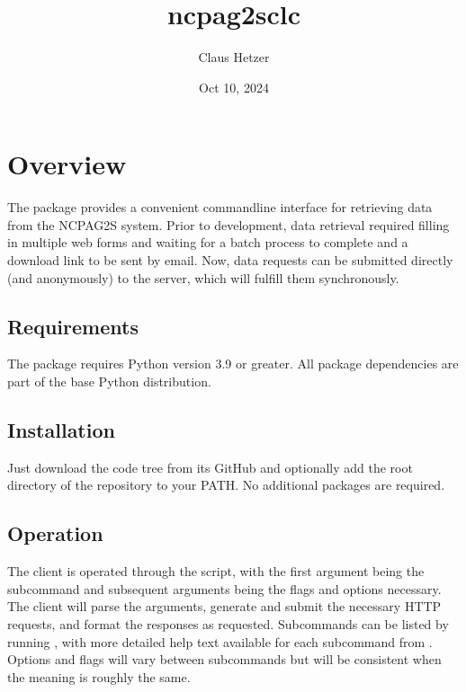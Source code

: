 \documentclass[letterpaper,10pt,english]{sphinxmanual}
\title{ncpag2s\sphinxhyphen{}clc}
\date{Oct 10, 2024}
\author{Claus Hetzer}
\begin{document}
\pagestyle{empty}
\sphinxmaketitle
\pagestyle{plain}
\sphinxtableofcontents
\pagestyle{normal}
\label{\detokenize{index::doc}}



\chapter{Overview}
\label{\detokenize{overview:overview}}\label{\detokenize{overview:id1}}\label{\detokenize{overview::doc}}
\sphinxAtStartPar
The  package provides a convenient command\sphinxhyphen{}line interface for retrieving data from the NCPA\sphinxhyphen{}G2S system.  Prior to development, data retrieval required filling in multiple web forms and waiting for a batch process to complete and a download link to be sent by email.  Now, data requests can be submitted directly (and anonymously) to the server, which will fulfill them synchronously.


\section{Requirements}
\label{\detokenize{overview:requirements}}
\sphinxAtStartPar
The  package requires Python version 3.9 or greater.  All package dependencies are part of the base Python distribution.


\section{Installation}
\label{\detokenize{overview:installation}}
\sphinxAtStartPar
Just download the code tree from its GitHub  and optionally add the root directory of the repository to your PATH. No additional packages are required.


\section{Operation}
\label{\detokenize{overview:operation}}
\sphinxAtStartPar
The client is operated through the  script, with the first argument being the subcommand and subsequent arguments being the flags and options necessary. The client will parse the arguments, generate and submit the necessary HTTP requests, and format the responses as requested.  Subcommands can be listed by running , with more detailed help text available for each subcommand from .  Options and flags will vary between subcommands but will be consistent when the meaning is roughly the same.
\end{document}
